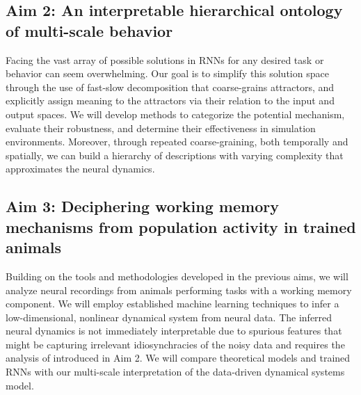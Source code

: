 \documentclass[12pt,letterpaper, onecolumn]{article}
\theoremstyle{definition}
\theoremstyle{remark}
\begin{document}
\subsection*{Aim 2: An interpretable hierarchical ontology of multi-scale behavior}
Facing the vast array of possible solutions in RNNs for any desired task or behavior can seem overwhelming.
Our goal is to simplify this solution space through the use of fast-slow decomposition that coarse-grains attractors, and explicitly assign meaning to the attractors via their relation to the input and output spaces.
We will develop methods to categorize the potential mechanism, evaluate their robustness, and determine their effectiveness in simulation environments.
Moreover, through repeated coarse-graining, both temporally and spatially, we can build a hierarchy of descriptions with varying complexity that approximates the neural dynamics.

\subsection*{Aim 3: Deciphering working memory mechanisms from population activity in trained animals}
Building on the tools and methodologies developed in the previous aims, we will analyze neural recordings from animals performing tasks with a working memory component.
We will employ established machine learning techniques to infer a low-dimensional, nonlinear dynamical system from  neural data.
The inferred neural dynamics is not immediately interpretable due to spurious features that might be capturing irrelevant idiosynchracies of the noisy data and requires the analysis of introduced in Aim 2. %
We will compare theoretical models and trained RNNs with our multi-scale interpretation of the data-driven dynamical systems model.
\end{document}
